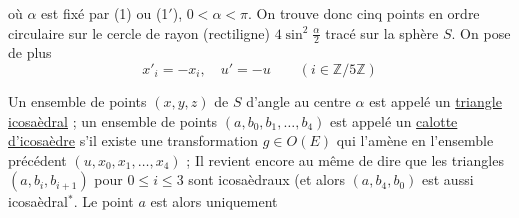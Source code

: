 où $\alpha$ est fixé par (1) ou (1$'$), $0<\alpha<\pi$. On trouve donc cinq points en ordre circulaire sur le cercle de  rayon (rectiligne) $4\sin^2\frac{\alpha}{2}$ tracé sur la sphère $S$. On pose de plus
\[
x'_i=-x_i,\quad u'=-u\qquad (i\in\mathbb Z/5\mathbb Z)\tag*{(5)}
\]

Un ensemble de points $(x,y,z)$ de $S$  d'angle au centre $\alpha$ est appelé un \uline{triangle icosaèdral} ;  un ensemble de points $(a,b_0,b_1,\ldots,b_4)$  est appelé un \uline{calotte d'icosaèdre} s'il existe une transformation  $g\in O(E)$ qui l'amène en l'ensemble précédent $(u,x_0,x_1,\ldots,x_4)$ ; Il revient encore au même  de dire  que les triangles $(a,b_i,b_{i+1})$ pour $0\leq i\leq3$ sont icosaèdraux (et alors $(a,b_4,b_0)$ est aussi icosaèdral$^{*}$. Le point $a$ est alors uniquement

